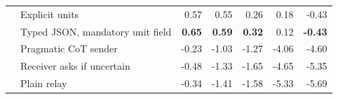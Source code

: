 \begin{tabular}{llrrrrr}
 & Explicit units \citep{miao2026capri} & 0.57 & 0.55 & 0.26 & 0.18 & -0.43 \\
 & Typed JSON, mandatory unit field & \textbf{0.65} & \textbf{0.59} & \textbf{0.32} & 0.12 & \textbf{-0.43} \\
 & Pragmatic CoT sender \citep{miao2026capri} & -0.23 & -1.03 & -1.27 & -4.06 & -4.60 \\
 & Receiver asks if uncertain \citep{matsnev2026uncertainty} & -0.48 & -1.33 & -1.65 & -4.65 & -5.35 \\
 & Plain relay & -0.34 & -1.41 & -1.58 & -5.33 & -5.69 \\
\bottomrule
\end{tabular}
